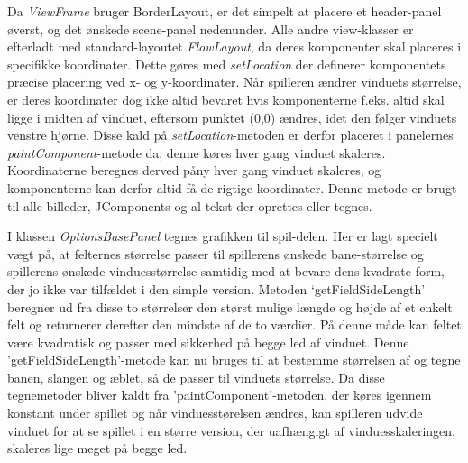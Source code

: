 Da \textit{ViewFrame} bruger BorderLayout, er det simpelt at placere et header-panel øverst, og det ønskede scene-panel nedenunder. Alle andre view-klasser er efterladt med standard-layoutet \textit{FlowLayout}, da deres komponenter skal placeres i specifikke koordinater. Dette gøres med \textit{setLocation} der definerer komponentets præcise placering ved x- og y-koordinater. Når spilleren ændrer vinduets størrelse, er deres koordinater dog ikke altid bevaret hvis komponenterne f.eks. altid skal ligge i midten af vinduet, eftersom punktet (0,0) ændres, idet den følger vinduets venstre hjørne. Disse kald på \textit{setLocation}-metoden er derfor placeret i panelernes \textit{paintComponent}-metode da, denne køres hver gang vinduet skaleres. Koordinaterne beregnes derved påny hver gang vinduet skaleres, og komponenterne kan derfor altid få de rigtige koordinater. Denne metode er brugt til alle billeder, JComponents og al tekst der oprettes eller tegnes.

I klassen \textit{OptionsBasePanel} tegnes grafikken til spil-delen. Her er lagt specielt vægt på, at felternes størrelse passer til spillerens ønskede bane-størrelse og spillerens ønskede vinduesstørrelse samtidig med at bevare dens kvadrate form, der jo ikke var tilfældet i den simple version. Metoden `getFieldSideLength' beregner ud fra disse to størrelser den størst mulige længde og højde af et enkelt felt og returnerer derefter den mindste af de to værdier. På denne måde kan feltet være kvadratisk og passer med sikkerhed på begge led af vinduet. Denne 'getFieldSideLength'-metode kan nu bruges til at bestemme størrelsen af og tegne banen, slangen og æblet, så de passer til vinduets størrelse. Da disse tegnemetoder bliver kaldt fra 'paintComponent'-metoden, der køres igennem konstant under spillet og når vinduesstørelsen ændres, kan spilleren udvide vinduet for at se spillet i en større version, der uafhængigt af vinduesskaleringen, skaleres lige meget på begge led.

